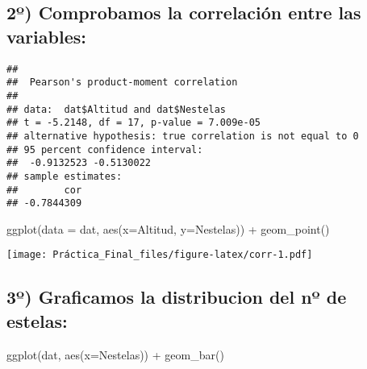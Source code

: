 \documentclass[
]{article}
\newenvironment{Shaded}{\begin{snugshade}}{\end{snugshade}}
\newcommand{\AttributeTok}[1]{\textcolor[rgb]{0.77,0.63,0.00}{#1}}
\newcommand{\CommentTok}[1]{\textcolor[rgb]{0.56,0.35,0.01}{\textit{#1}}}
\newcommand{\FunctionTok}[1]{\textcolor[rgb]{0.00,0.00,0.00}{#1}}
\newcommand{\NormalTok}[1]{#1}
\newcommand{\SpecialCharTok}[1]{\textcolor[rgb]{0.00,0.00,0.00}{#1}}
\begin{document}
\hypertarget{uxba-comprobamos-la-correlaciuxf3n-entre-las-variables}{%
\subsection{2º) Comprobamos la correlación entre las
variables:}\label{uxba-comprobamos-la-correlaciuxf3n-entre-las-variables}}

\begin{Shaded}
\end{Shaded}

\begin{verbatim}
## 
##  Pearson's product-moment correlation
## 
## data:  dat$Altitud and dat$Nestelas
## t = -5.2148, df = 17, p-value = 7.009e-05
## alternative hypothesis: true correlation is not equal to 0
## 95 percent confidence interval:
##  -0.9132523 -0.5130022
## sample estimates:
##        cor 
## -0.7844309
\end{verbatim}

\begin{Shaded}
\begin{Highlighting}[]
\FunctionTok{ggplot}\NormalTok{(}\AttributeTok{data =}\NormalTok{ dat, }\FunctionTok{aes}\NormalTok{(}\AttributeTok{x=}\NormalTok{Altitud, }\AttributeTok{y=}\NormalTok{Nestelas)) }\SpecialCharTok{+} \FunctionTok{geom\_point}\NormalTok{()}
\end{Highlighting}
\end{Shaded}

\texttt{[image: Práctica\_Final\_files/figure-latex/corr-1.pdf]}

\hypertarget{uxba-graficamos-la-distribucion-del-nuxba-de-estelas}{%
\subsection{3º) Graficamos la distribucion del nº de
estelas:}\label{uxba-graficamos-la-distribucion-del-nuxba-de-estelas}}

\begin{Shaded}
\begin{Highlighting}[]
\FunctionTok{ggplot}\NormalTok{(dat, }\FunctionTok{aes}\NormalTok{(}\AttributeTok{x=}\NormalTok{Nestelas)) }\SpecialCharTok{+} \FunctionTok{geom\_bar}\NormalTok{()}
\end{Highlighting}
\end{Shaded}
\end{document}
